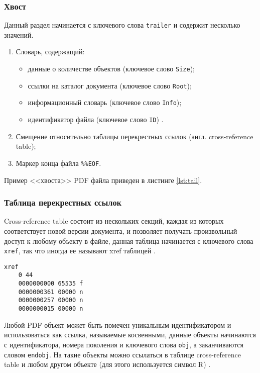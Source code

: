 \subsubsection{Хвост}
Данный раздел начинается с ключевого слова \texttt{trailer} и содержит несколько значений.
\begin{enumerate}
	\item Словарь, содержащий:
	\begin{itemize}
		\item данные о количестве объектов (ключевое слово \texttt{Size});
		\item ссылки на каталог документа (ключевое слово \texttt{Root});
		\item информационный словарь (ключевое слово \texttt{Info});
		\item идентификатор файла (ключевое слово \texttt{ID}) \cite{pdf_object_def}.
	\end{itemize}
	\item Смещение относительно таблицы  перекрестных ссылок (англ. cross-reference table);
	\item Маркер конца файла \texttt{\%\%EOF}.
\end{enumerate}
Пример <<хвоста>> PDF файла приведен в листинге \ref{lst:tail}.


	



\subsubsection{Таблица  перекрестных ссылок}
Cross-reference table состоит из нескольких секций, каждая из которых соответствует новой версии документа, и позволяет получать произвольный доступ к любому объекту в файле, данная таблица начинается с ключевого слова \texttt{xref}, так что иногда ее называют xref таблицей \cite{pdf_structure_trans}.

\begin{lstlisting}[label=lst:xref,caption=Пример таблицы перекрестных ссылок]
	xref
	0 44
	0000000000 65535 f 
	0000000361 00000 n 
	0000000257 00000 n 
	0000000015 00000 n 
\end{lstlisting}






Любой PDF-объект может быть помечен уникальным идентификатором и использоваться как ссылка, называемые косвенными, данные объекты начинаются с идентификатора, номера поколения и ключевого слова \texttt{obj}, а заканчиваются словом \texttt{endobj}. На такие объекты можно ссылаться в таблице 
cross-reference table и любом другом объекте (для этого используется символ R) \cite{pdf_structure_trans}. 


